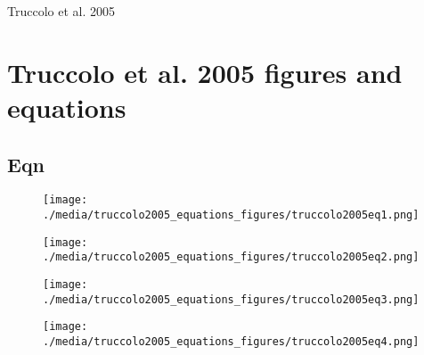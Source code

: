 \documentclass[svgnames,13pt]{beamer}
\begin{document}
\begin{frame}{}
\begin{center}
	Truccolo et al. 2005 
\end{center}
\end{frame} 


\section{Truccolo et al. 2005 figures and equations}


\subsection{ Eqn}

\begin{frame}{}
\begin{figure}\centering\texttt{[image: ./media/truccolo2005\_equations\_figures/truccolo2005eq1.png]}\\\end{figure}
\end{frame} 

\begin{frame}{}
\begin{figure}\centering\texttt{[image: ./media/truccolo2005\_equations\_figures/truccolo2005eq2.png]}\\\end{figure}
\end{frame} 

\begin{frame}{}
\begin{figure}\centering\texttt{[image: ./media/truccolo2005\_equations\_figures/truccolo2005eq3.png]}\\\end{figure}
\end{frame} 

\begin{frame}{}
\begin{figure}\centering\texttt{[image: ./media/truccolo2005\_equations\_figures/truccolo2005eq4.png]}\\\end{figure}
\end{frame} 
\end{document}
